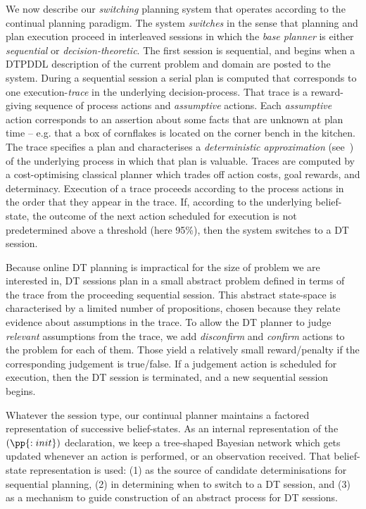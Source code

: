 
\newcommand{\entropy}{\ensuremath{\mathrm{H}}}


We now describe our {\em switching} planning system that operates
according to the continual planning paradigm. The system {\em
  switches} in the sense that planning and plan execution proceed in
interleaved sessions in which the {\em base planner} is either {\em
  sequential} or {\em decision-theoretic}.  The first session is
sequential, and begins when a DTPDDL description of the current
problem and domain are posted to the system.  During a sequential
session a serial plan is computed that corresponds to one
execution-{\em trace} in the underlying decision-process. That trace
is a reward-giving sequence of process actions and {\em assumptive}
actions. Each {\em assumptive} action corresponds to an assertion
about some facts that are unknown at plan time -- e.g. that a box of
cornflakes is located on the corner bench in the kitchen. The trace
specifies a plan and characterises a {\em deterministic approximation}
(see~\cite{yoon:etal:2008}) of the underlying process in which that
plan is valuable. Traces are computed by a cost-optimising classical
planner which trades off action costs, goal rewards, and
determinacy. Execution of a trace proceeds according to the process
actions in the order that they appear in the trace. If, according to
the underlying belief-state, the outcome of the next action scheduled
for execution is not predetermined above a threshold (here 95\%), then
the system switches to a DT session.




Because online DT planning is impractical for the size of problem we
are interested in, DT sessions plan in a small abstract problem
defined in terms of the trace from the proceeding sequential session.
This abstract state-space is characterised by a limited number of
propositions, chosen because they relate evidence about assumptions
in the trace.  To allow the DT planner to judge {\em relevant}
assumptions from the trace, we add {\em disconfirm} and {\em confirm}
actions to the problem for each of them. Those yield a relatively
small reward/penalty if the corresponding judgement is true/false. If
a judgement action is scheduled for execution, then the DT session is
terminated, and a new sequential session begins.

Whatever the session type, our continual planner maintains a factored
representation of successive belief-states.  As an internal
representation of the $(\pp{:init})$ declaration, we keep a
tree-shaped Bayesian network which gets updated whenever an action is
performed, or an observation received. That belief-state
representation is used: (1) as the source of candidate
determinisations for sequential planning, (2) in determining when to
switch to a DT session, and (3) as a mechanism to guide construction
of an abstract process for DT sessions.

